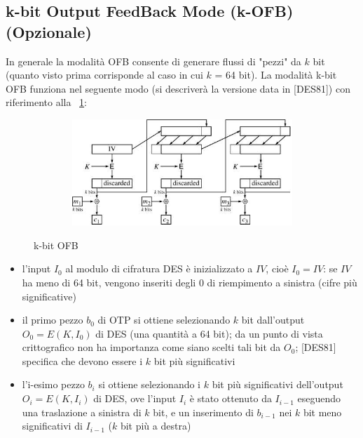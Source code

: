 \subsection{k-bit Output FeedBack Mode (k-OFB) (Opzionale)}
In generale la modalità OFB consente di generare flussi di "pezzi" da $k$ bit (quanto visto prima corrisponde al caso in cui $k$ = 64 bit).
La modalità k-bit OFB funziona nel seguente modo (si descriverà la versione data in [DES81]) con riferimento alla \figurename ~\ref{fig:k-bit_OFB}:
\begin{figure}[htbp]
	\centering%
	\subfigure%
	{\includegraphics[height=4cm, width=12cm, keepaspectratio]{Immagini/modalita_operative/k-bit_OFB.png}}
	\caption{k-bit OFB \label{fig:k-bit_OFB}} 	
\end{figure}
\begin{itemize}
\item l'input $I_{0}$ al modulo di cifratura DES è inizializzato a $IV$, cioè $I_{0}=IV$: se $IV$ ha meno di 64 bit, vengono inseriti degli 0 di riempimento a sinistra (cifre più significative)
\item il primo pezzo $b_{0}$ di OTP si ottiene selezionando $k$ bit dall'output $O_{0} = E(K, I_{0})$ di DES (una quantità a 64 bit); da un punto di vista crittografico non ha importanza come siano scelti tali bit da $O_{0}$; [DES81] specifica che devono essere i $k$ bit più significativi
\item l’i-esimo pezzo $b_{i}$ si ottiene selezionando i $k$ bit più significativi dell'output $O_{i} = E(K, I_{i})$ di DES, ove l'input $I_{i}$ è stato ottenuto da $I_{i-1}$ eseguendo una traslazione a sinistra di $k$ bit, e un inserimento di $b_{i-1}$ nei $k$ bit meno significativi di $I_{i-1}$ ($k$ bit più a destra)
\end{itemize}
